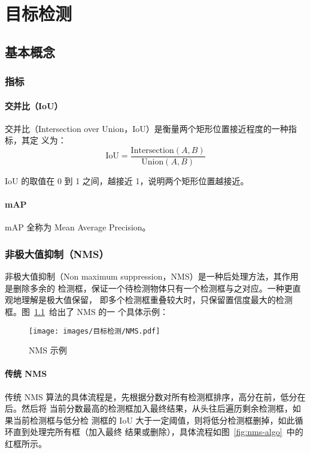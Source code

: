 \part{目标检测}
\chapter{基本概念}

\section{指标}

\subsection{交并比（IoU）}
交并比（Intersection over Union，IoU）是衡量两个矩形位置接近程度的一种指标，其定
义为：
\begin{equation}
  \label{equ:IoU}
  \mathrm{IoU} = \frac{\mathrm{Intersection}(A, B)}{\mathrm{Union}(A, B)}
\end{equation}

IoU 的取值在 0 到 1 之间，越接近 1，说明两个矩形位置越接近。

\subsection{mAP}
mAP 全称为 Mean Average Precision。

\section{非极大值抑制（NMS）}

非极大值抑制（Non maximum suppression，NMS）是一种后处理方法，其作用是删除多余的
检测框，保证一个待检测物体只有一个检测框与之对应。一种更直观地理解是极大值保留，
即多个检测框重叠较大时，只保留置信度最大的检测框。图~\ref{fig:nms}~给出了 NMS 的一
个具体示例：

\begin{figure}[ht]
  \centering
  \texttt{[image: images/目标检测/NMS.pdf]}
  \caption{NMS 示例}
  \label{fig:nms}
\end{figure}

\subsection{传统 NMS}

传统 NMS 算法的具体流程是，先根据分数对所有检测框排序，高分在前，低分在后。然后将
当前分数最高的检测框加入最终结果，从头往后遍历剩余检测框，如果当前检测框与低分检
测框的 IoU 大于一定阈值，则将低分检测框删掉，如此循环直到处理完所有框（加入最终
结果或删除），具体流程如图~\ref{fig:nms-algo}~中的红框所示。

